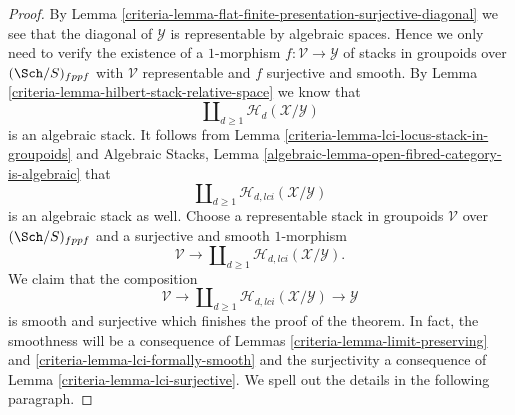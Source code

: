 \begin{proof}

By
Lemma \ref{criteria-lemma-flat-finite-presentation-surjective-diagonal}
we see that the diagonal of $\mathcal{Y}$ is representable by algebraic
spaces. Hence we only need to verify the existence of a $1$-morphism
$f : \mathcal{V} \to \mathcal{Y}$ of stacks in groupoids over
$(\Sch/S)_{fppf}$ with $\mathcal{V}$ representable and
$f$ surjective and smooth. By
Lemma \ref{criteria-lemma-hilbert-stack-relative-space}
we know that
$$
\coprod\nolimits_{d \geq 1} \mathcal{H}_d(\mathcal{X}/\mathcal{Y})
$$
is an algebraic stack. It follows from
Lemma \ref{criteria-lemma-lci-locus-stack-in-groupoids}
and
Algebraic Stacks,
Lemma \ref{algebraic-lemma-open-fibred-category-is-algebraic}
that
$$
\coprod\nolimits_{d \geq 1} \mathcal{H}_{d, lci}(\mathcal{X}/\mathcal{Y})
$$
is an algebraic stack as well. Choose a representable stack in groupoids
$\mathcal{V}$ over $(\Sch/S)_{fppf}$ and a surjective and smooth
$1$-morphism
$$
\mathcal{V}
\longrightarrow
\coprod\nolimits_{d \geq 1} \mathcal{H}_{d, lci}(\mathcal{X}/\mathcal{Y}).
$$
We claim that the composition
$$
\mathcal{V}
\longrightarrow
\coprod\nolimits_{d \geq 1} \mathcal{H}_{d, lci}(\mathcal{X}/\mathcal{Y})
\longrightarrow
\mathcal{Y}
$$
is smooth and surjective which finishes the proof of the theorem. In fact,
the smoothness will be a consequence of
Lemmas \ref{criteria-lemma-limit-preserving} and \ref{criteria-lemma-lci-formally-smooth}
and the surjectivity a consequence of
Lemma \ref{criteria-lemma-lci-surjective}.
We spell out the details in the following paragraph.


\end{proof}
